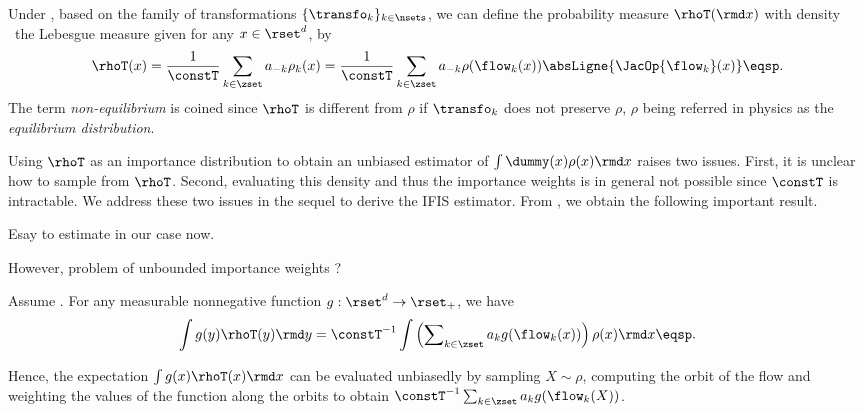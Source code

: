    Under
  , based on the family of transformations $\{\transfo_k\}_{k\in\nsets}$, we can define the probability measure
  $\rhoT(\rmd x)$ with density \wrt~the Lebesgue measure given for
  any $x \in \rset^d$, by
\begin{equation*}
    \rhoT(x) =  \frac{1}{\constT}\sum_{k \in \zset} a_{-k} \rho_k(x)= \frac{1}{\constT} \sum_{k \in \zset} a_{-k} \rho(\flow_k(x))  \absLigne{\JacOp{\flow_k}(x)} \eqsp.
  \end{equation*}
The term \textit{non-equilibrium} is coined since $\rhoT$ is different from $\rho$ if $\transfo_k$ does not
  preserve $\rho$, $\rho$ being referred
  in physics as the \textit{equilibrium distribution}. 
  
  Using $\rhoT$ as an importance distribution to obtain an unbiased
  estimator of $\int \dummy(x) \rho(x) \rmd x$ raises two issues.
First, it is unclear how to sample from $\rhoT$. Second, evaluating this density and thus the importance weights is in general not possible since $\constT$ is intractable. We address these two issues in the sequel to derive the IFIS estimator. From , we obtain the following important result.
  
  Esay to estimate in our case now.
  
  However, problem of unbounded importance weights ?
  
\begin{theorem}
 \label{theo:inf_non_eq}
 Assume .  For any measurable nonnegative function $g:\rset^d \to \rset_+$, we have
\begin{equation}
\label{eq:inf_non_eq_av}
  \int
g(y)     \rhoT(y) \rmd y  = \constT^{-1} \int \left(\sum\nolimits_{k\in\zset} a_{k}g(\flow_k(x))  \right)\rho({x})\rmd x \eqsp.
\end{equation}
\end{theorem}
Hence, the expectation $\int g(x) \rhoT(x)\rmd x$ can be evaluated unbiasedly by sampling $X\sim\rho$, computing the orbit of the flow and weighting the values of the function along the orbits to obtain 
  $\constT^{-1}\sum_{k \in \zset}
  a_{k}g(\flow_k(X))$.
  
